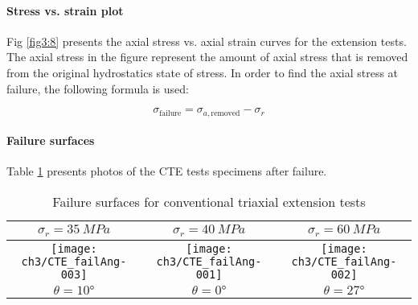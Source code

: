 \paragraph{Stress vs. strain plot}

Fig \ref{fig3:8} presents the axial stress vs. axial strain curves for the extension tests. The axial stress in the figure represent the amount of axial stress that is removed from the original hydrostatics state of stress. In order to find the axial stress at failure, the following formula is used: 

\begin{equation}
    \sigma_\text{failure} = \sigma_{a,\text{removed}} - \sigma_r
\end{equation}

\paragraph{Failure surfaces}

Table \ref{tb3:photoCTE} presents photos of the CTE tests specimens after failure. 


\begin{table}
    \centering
    \caption{Failure surfaces for conventional triaxial extension tests}
    \begin{tabular}{|c|c|c|}
     \hline
     $\sigma_r = \SI{35}{MPa}$ & $\sigma_r = \SI{40}{MPa}$ &  $\sigma_r = \SI{60}{MPa}$ \\
     \hline
     \texttt{[image: ch3/CTE\_failAng-003]} & 
     \texttt{[image: ch3/CTE\_failAng-001]} &
     \texttt{[image: ch3/CTE\_failAng-002]} \\
     \hline
     $\theta = \ang{10}$ & $\theta = \ang{0}$  &  $\theta = \ang{27}$ \\
     \hline
    \end{tabular}
    \label{tb3:photoCTE}
\end{table}


